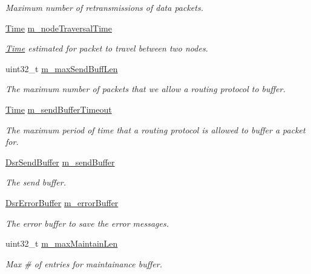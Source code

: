 \begin{DoxyCompactItemize}
\begin{DoxyCompactList}\small\item\em Maximum number of retransmissions of data packets. \end{DoxyCompactList}\item 
\hyperlink{classns3_1_1Time}{Time} \hyperlink{classns3_1_1dsr_1_1DsrRouting_a4c406057009653878e8cdf3e3a7f2106}{m\+\_\+node\+Traversal\+Time}
\begin{DoxyCompactList}\small\item\em \hyperlink{classns3_1_1Time}{Time} estimated for packet to travel between two nodes. \end{DoxyCompactList}\item 
uint32\+\_\+t \hyperlink{classns3_1_1dsr_1_1DsrRouting_a5cf78026e2a25a4468c04745f4a10c13}{m\+\_\+max\+Send\+Buff\+Len}
\begin{DoxyCompactList}\small\item\em The maximum number of packets that we allow a routing protocol to buffer. \end{DoxyCompactList}\item 
\hyperlink{classns3_1_1Time}{Time} \hyperlink{classns3_1_1dsr_1_1DsrRouting_a1f89794801db0336d92e4ca85fbc09a7}{m\+\_\+send\+Buffer\+Timeout}
\begin{DoxyCompactList}\small\item\em The maximum period of time that a routing protocol is allowed to buffer a packet for. \end{DoxyCompactList}\item 
\hyperlink{classns3_1_1dsr_1_1DsrSendBuffer}{Dsr\+Send\+Buffer} \hyperlink{classns3_1_1dsr_1_1DsrRouting_a887ae39d7060171753c0605d5c120549}{m\+\_\+send\+Buffer}
\begin{DoxyCompactList}\small\item\em The send buffer. \end{DoxyCompactList}\item 
\hyperlink{classns3_1_1dsr_1_1DsrErrorBuffer}{Dsr\+Error\+Buffer} \hyperlink{classns3_1_1dsr_1_1DsrRouting_a802e15bf588fd1e9ccd401221461397a}{m\+\_\+error\+Buffer}
\begin{DoxyCompactList}\small\item\em The error buffer to save the error messages. \end{DoxyCompactList}\item 
uint32\+\_\+t \hyperlink{classns3_1_1dsr_1_1DsrRouting_a65f608e0cfba00495392f94938fc02c0}{m\+\_\+max\+Maintain\+Len}
\begin{DoxyCompactList}\small\item\em Max \# of entries for maintainance buffer. \end{DoxyCompactList}\item 

\end{DoxyCompactItemize}
